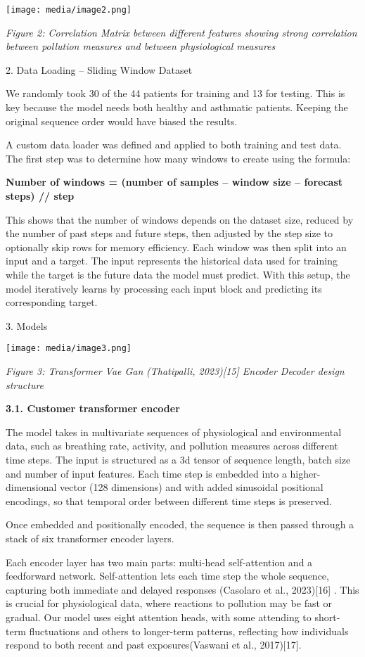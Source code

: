 \documentclass[
]{article}
\begin{document}
\texttt{[image: media/image2.png]}

\emph{Figure 2: Correlation Matrix between different features showing
strong correlation between pollution measures and between physiological
measures}

2. Data Loading -- Sliding Window Dataset

We randomly took 30 of the 44 patients for training and 13 for testing.
This is key because the model needs both healthy and asthmatic patients.
Keeping the original sequence order would have biased the results.

A custom data loader was defined and applied to both training and test
data. The first step was to determine how many windows to create using
the formula:

\textbf{Number of windows = (number of samples -- window size --
forecast steps) // step}

This shows that the number of windows depends on the dataset size,
reduced by the number of past steps and future steps, then adjusted by
the step size to optionally skip rows for memory efficiency. Each window
was then split into an input and a target. The input represents the
historical data used for training while the target is the future data
the model must predict. With this setup, the model iteratively learns by
processing each input block and predicting its corresponding target.

3. Models

\texttt{[image: media/image3.png]}

\emph{Figure 3: Transformer Vae Gan} \emph{(Thatipalli, 2023){[}15{]}
Encoder Decoder design structure}

\textbf{3.1. Customer transformer encoder}

The model takes in multivariate sequences of physiological and
environmental data, such as breathing rate, activity, and pollution
measures across different time steps. The input is structured as a 3d
tensor of sequence length, batch size and number of input features. Each
time step is embedded into a higher-dimensional vector (128 dimensions)
and with added sinusoidal positional encodings, so that temporal order
between different time steps is preserved.

Once embedded and positionally encoded, the sequence is then passed
through a stack of six transformer encoder layers.

Each encoder layer has two main parts: multi-head self-attention and a
feedforward network. Self-attention lets each time step the whole
sequence, capturing both immediate and delayed responses (Casolaro et
al., 2023){[}16{]} . This is crucial for physiological data, where
reactions to pollution may be fast or gradual. Our model uses eight
attention heads, with some attending to short-term fluctuations and
others to longer-term patterns, reflecting how individuals respond to
both recent and past exposures(Vaswani et al., 2017){[}17{]}.
\end{document}
